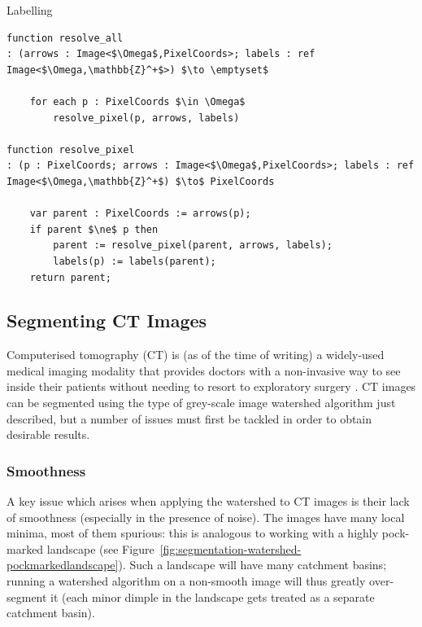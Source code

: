 \begin{stulisting}[p]
\caption{Labelling}
\label{code:segmentation-watershed-labelling}
\begin{lstlisting}[style=Default]
function resolve_all
: (arrows : Image<$\Omega$,PixelCoords>; labels : ref Image<$\Omega,\mathbb{Z}^+$>) $\to \emptyset$

	for each p : PixelCoords $\in \Omega$
		resolve_pixel(p, arrows, labels)

function resolve_pixel
: (p : PixelCoords; arrows : Image<$\Omega$,PixelCoords>; labels : ref Image<$\Omega,\mathbb{Z}^+$) $\to$ PixelCoords

	var parent : PixelCoords := arrows(p);
	if parent $\ne$ p then
		parent := resolve_pixel(parent, arrows, labels);
		labels(p) := labels(parent);
	return parent;
\end{lstlisting}
\end{stulisting}

\subsection{Segmenting CT Images}

Computerised tomography (CT) is (as of the time of writing) a widely-used medical imaging modality that provides doctors with a non-invasive way to see inside their patients without needing to resort to exploratory surgery \cite{?}. CT images can be segmented using the type of grey-scale image watershed algorithm just described, but a number of issues must first be tackled in order to obtain desirable results.

\subsubsection{Smoothness}

A key issue which arises when applying the watershed to CT images is their lack of smoothness (especially in the presence of noise). The images have many local minima, most of them spurious: this is analogous to working with a highly pock-marked landscape (see Figure~\ref{fig:segmentation-watershed-pockmarkedlandscape}). Such a landscape will have many catchment basins; running a watershed algorithm on a non-smooth image will thus greatly over-segment it (each minor dimple in the landscape gets treated as a separate catchment basin).


